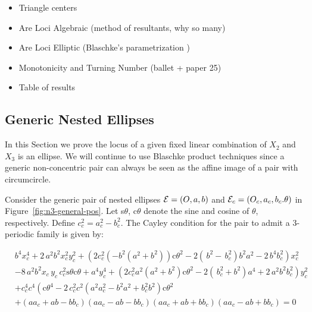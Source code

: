 \begin{itemize}
    \item Triangle centers
    \item Are Loci Algebraic (method of resultants, why so many)
    \item Are Loci Elliptic (Blaschke's parametrization \cite{daepp-2019})
    \item Monotonicity and Turning Number (ballet + paper 25)
    \item Table of results
\end{itemize}

\subsection{Generic Nested Ellipses}
 
 In this Section we prove the locus of a given fixed linear combination of $X_2$ and $X_3$ is an ellipse. We will continue to use Blaschke product techniques since a generic non-concentric pair can always be seen as the affine image of a pair with circumcircle.

Consider the generic pair of nested ellipses $\mathcal{E}=(O,a,b)$ and $\mathcal{E}_c=(O_c,a_c,b_c.\theta)$ in Figure~\ref{fig:n3-general-pos}. Let s$\theta$, c$\theta$ denote the sine and cosine of $\theta$, respectively. Define $c_c^2=a_c^2-b_c^2$. The Cayley condition for the pair to admit a 3-periodic family is given by:

{\small
\begin{align}
&{b}^{4}x_c^{4}+2\,{a}^{2}{b}^{2}x_c^{2}y_c^{2}+
 \left(  2 c_c^2  \left( -{b}^{2}({a}^{2}+{b}^{2} )\right)  \text{c}\theta^2  - 2\left(  \,b ^{2}- \,b_c
^{2} \right) {b}^{2}{a}^{2}-2\,{b}^{4}b_c^{2} \right)x_c
^{2} \label{eqn:cayley}\\
&-8\,{a}^{2}{b}^{2}x_c\,{  y_c}\,c_c^2 
\text{s}\theta\text{c}\theta  +{a}^{4}y_c^{4} + \left(  2 c_c^2 a^2 \left(
{a}^{2}+{b}^{2}  \right)\text{c}\theta^2  
 -2 \left(  \,b_c^{2}+{b}^{2} \right) {a}^{4}+2
\,{a}^{2}{b}^{2}b_c^{2} \right) y_c^{2} \nonumber\\
&+ c_c^4  c^4  \left( \text{c}\theta^4-2\, c_c^2 c^2
  \left( {a}^{2} a_c^{2}-{b}^{2}{a}^{2}+
b_c^{2}{b}^{2} \right) \text{c}\theta^2 \right. \nonumber\\
 &+ \left( a a_c+a b-b b_c \right)  \left( a a_c
-a b -b b_c \right)  \left( a a_c+a b+b b_c \right)  \left( a
a_c-a b+b b_c \right) = 0\nonumber
\end{align}
}


